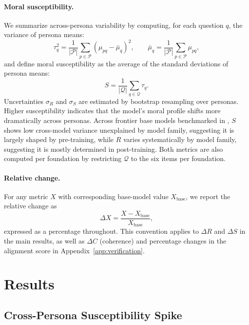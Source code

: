 \documentclass{article}
\begin{document}
\paragraph{Moral susceptibility.} We summarize across-persona variability by computing, for each question $q$, the variance of persona means:
\begin{equation}
  \tau_q^2 = \frac{1}{|\mathcal{P}|} \sum_{p \in \mathcal{P}} (\mu_{pq} - \bar{\mu}_q)^2, \qquad
  \bar{\mu}_q = \frac{1}{|\mathcal{P}|} \sum_{p \in \mathcal{P}} \mu_{pq},
  \label{eq:question-dispersion}
\end{equation}
and define moral susceptibility as the average of the standard deviations of persona means:
\begin{equation}
  S = \frac{1}{|\mathcal{Q}|} \sum_{q \in \mathcal{Q}} \tau_q.
  \label{eq:susceptibility}
\end{equation}
Uncertainties $\sigma_R$ and $\sigma_S$ are estimated by bootstrap resampling over personas. Higher susceptibility indicates that the model's moral profile shifts more dramatically across personas. Across frontier base models benchmarked in \citep{costa2025moral}, $S$ shows low cross-model variance unexplained by model family, suggesting it is largely shaped by pre-training, while $R$ varies systematically by model family, suggesting it is mostly determined in post-training. Both metrics are also computed per foundation by restricting $\mathcal{Q}$ to the six items per foundation.

\paragraph{Relative change.} For any metric $X$ with corresponding base-model value $X_{\text{base}}$, we report the relative change as
\begin{equation}
  \Delta X = \frac{X - X_{\text{base}}}{X_{\text{base}}},
  \label{eq:delta}
\end{equation}
expressed as a percentage throughout. This convention applies to $\Delta R$ and $\Delta S$ in the main results, as well as $\Delta C$ (coherence) and percentage changes in the alignment score in Appendix~\ref{app:verification}.


\section{Results}

\subsection{Cross-Persona Susceptibility Spike}
\label{sec:susceptibility}
\end{document}
